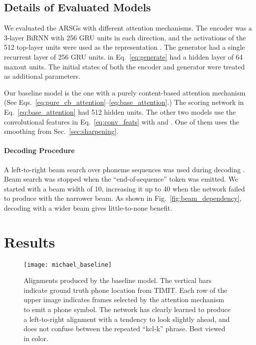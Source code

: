 \documentclass{article}
\begin{document}
\subsection{Details of Evaluated Models}
\label{sec:evaluate}

We evaluated the ARSGs with different attention mechanisms.  The encoder was a
3-layer BiRNN with 256 GRU units in each direction, and the activations of the
512 top-layer units were used as the representation .  The generator had a
single recurrent layer of 256 GRU units. 
 in Eq.~\eqref{eq:generate} had a hidden layer of 64 maxout units.
The initial states of both the encoder and generator were treated as additional
parameters.







Our baseline model is the one with a purely content-based attention mechanism
(See Eqs.~\eqref{eq:pure_cb_attention}--\eqref{eq:base_attention}.) The scoring
network in Eq.~\eqref{eq:base_attention} had 512 
hidden units.
The other two models use the convolutional features in Eq.~\eqref{eq:conv_feats}
with  and . One of them uses the smoothing from
Sec.~\ref{sec:sharpening}.

\paragraph{Decoding Procedure}
A left-to-right beam search over phoneme sequences
was used during decoding \cite{sutskever_sequence_2014}. Beam search was stopped
when the ``end-of-sequence'' token  was emitted. We
started with a beam width of 10, increasing it up to 40 when the network failed
to produce  with the narrower beam.  As shown in
Fig.~\ref{fig:beam_dependency}, decoding with a wider beam gives little-to-none
benefit. 


\section{Results}
\label{sec:results}

\begin{figure}[t]
  \centering
  \texttt{[image: michael\_baseline]}
\caption[Alignments produced by the baseline]{Alignments
      produced by the baseline model. The vertical bars
      indicate ground truth phone location from TIMIT. Each
      row of the upper image indicates frames selected by
      the attention mechanism to emit a phone symbol. 
The network has clearly learned to produce a left-to-right alignment with
      a tendency to look slightly ahead, and does not confuse between the
      repeated ``kcl-k'' phrase. 
      Best viewed in color.
}  
  \label{fig:ali_baseline}

  \vspace{-4mm}
\end{figure}
\end{document}
